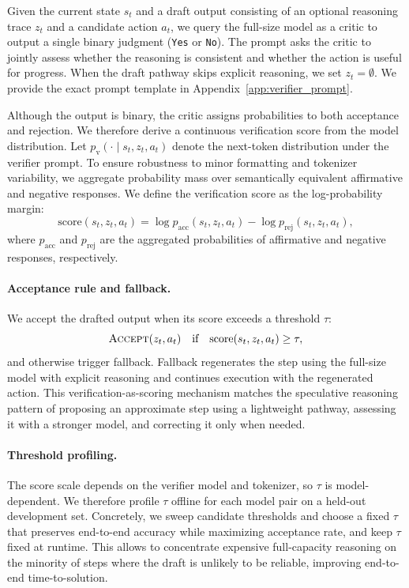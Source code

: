 Given the current state $s_t$ and a draft output consisting of an optional reasoning trace $z_t$ and a candidate action $a_t$, we query the full-size model as a critic to output a single binary judgment (\texttt{Yes} or \texttt{No}).
The prompt asks the critic to jointly assess whether the reasoning is consistent and whether the action is useful for progress.
When the draft pathway skips explicit reasoning, we set $z_t=\emptyset$.
We provide the exact prompt template in Appendix~\ref{app:verifier_prompt}.

Although the output is binary, the critic assigns probabilities to both acceptance and rejection.
We therefore derive a continuous verification score from the model distribution.
Let $p_{\mathrm{v}}(\cdot \mid s_t, z_t, a_t)$ denote the next-token distribution under the verifier prompt.
To ensure robustness to minor formatting and tokenizer variability, we aggregate probability mass over semantically equivalent affirmative and negative responses.
We define the verification score as the log-probability margin:
\begin{equation}
\mathrm{score}(s_t, z_t, a_t)
=
\log p_{\mathrm{acc}}(s_t, z_t, a_t)
-
\log p_{\mathrm{rej}}(s_t, z_t, a_t),
\label{eq:verifier_score}
\end{equation}
where $p_{\mathrm{acc}}$ and $p_{\mathrm{rej}}$ are the aggregated probabilities of affirmative and negative responses, respectively.


\paragraph{Acceptance rule and fallback.}
We accept the drafted output when its score exceeds a threshold $\tau$:
\begin{equation}
\textsc{Accept}(z_t, a_t)
\quad \text{if} \quad
\mathrm{score}(s_t, z_t, a_t) \ge \tau,
\label{eq:accept_rule}
\end{equation}
and otherwise trigger fallback.
Fallback regenerates the step using the full-size model with explicit reasoning and continues execution with the regenerated action.
This verification-as-scoring mechanism matches the speculative reasoning pattern of proposing an approximate step using a lightweight pathway, assessing it with a stronger model, and correcting it only when needed.

\paragraph{Threshold profiling.}
The score scale depends on the verifier model and tokenizer, so $\tau$ is model-dependent.
We therefore profile $\tau$ offline for each model pair on a held-out development set.
Concretely, we sweep candidate thresholds and choose a fixed $\tau$ that preserves end-to-end accuracy while maximizing acceptance rate, and keep $\tau$ fixed at runtime.
This allows \method{} to concentrate expensive full-capacity reasoning on the minority of steps where the draft is unlikely to be reliable, improving end-to-end time-to-solution.

\fi